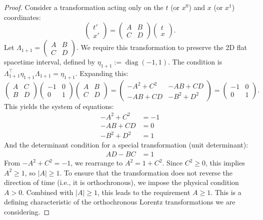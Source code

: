 \documentclass{amsart}
\theoremstyle{definition}
\theoremstyle{remark}
\DeclareMathOperator{\diag}{diag}
\begin{document}
\begin{proof}
  Consider a transformation acting only on the $t$ (or $x^0$) and $x$ (or $x^1$) coordinates:
  \begin{equation*}
    \begin{pmatrix} t' \\ x' \end{pmatrix} = \begin{pmatrix} A & B \\ C & D \end{pmatrix} \begin{pmatrix} t \\ x \end{pmatrix}.
  \end{equation*}
  Let $\Lambda_{1+1} = \begin{pmatrix} A & B \\ C & D \end{pmatrix}$. We require this transformation to preserve the 2D flat spacetime interval, defined by $\eta_{1+1} := \diag(-1, 1)$. The condition is $\Lambda_{1+1}^\top \eta_{1+1} \Lambda_{1+1} = \eta_{1+1}$.
  Expanding this:
  \begin{equation*}
    \begin{pmatrix} A & C \\ B & D \end{pmatrix}
    \begin{pmatrix} -1 & 0 \\ 0 & 1 \end{pmatrix}
    \begin{pmatrix} A & B \\ C & D \end{pmatrix}
    =
    \begin{pmatrix} -A^2 + C^2 & -AB + CD \\ -AB + CD & -B^2 + D^2 \end{pmatrix}
    =
    \begin{pmatrix} -1 & 0 \\ 0 & 1 \end{pmatrix}.
  \end{equation*}
  This yields the system of equations:
  \begin{align*}
    -A^2 + C^2 &= -1  \\ 
    -AB + CD &= 0  \\ 
    -B^2 + D^2 &= 1 
  \end{align*}
  And the determinant condition for a special transformation (unit determinant):
  \begin{align*}
    AD-BC &= 1 
  \end{align*}
  From $-A^2 + C^2 = -1$, we rearrange to $A^2 = 1 + C^2$. Since $C^2 \geq 0$, this implies $A^2 \geq 1$, so $|A| \geq 1$.
  To ensure that the transformation does not reverse the direction of time (i.e., it is orthochronous), we impose the physical condition $A > 0$. Combined with $|A| \geq 1$, this leads to the requirement $A \geq 1$. This is a defining characteristic of the orthochronous Lorentz transformations we are considering.


\end{proof}
\end{document}
